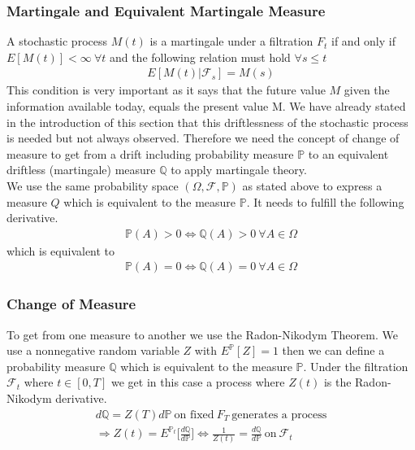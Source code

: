 \documentclass[11pt]{article}
\numberwithin{equation}{subsection}
\begin{document}
\subsubsection{Martingale and Equivalent Martingale Measure}
A stochastic process \(M(t)\) is a martingale under a filtration \(F_t\) if and only if \(E[M(t)] < \infty \  \forall t\) and the following relation must hold \(\forall s \leq t\)
\begin{eqnarray*}
	E[M(t)|\mathcal{F}_s] = M(s)
\end{eqnarray*}
This condition is very important as it says that the future value \(M\) given the information available today, equals the present value M. We have already stated in the introduction of this section that this driftlessness of the stochastic process is needed but not always observed. Therefore we need the concept of change of measure to get from a drift including probability measure \(\mathbb{P}\) to an equivalent driftless (martingale) measure \(\mathbb{Q}\) to apply martingale theory.\\
We use the same probability space \((\Omega, \mathcal{F}, \mathbb{P})\) as stated above to express a measure \(Q\) which is equivalent to the measure \(\mathbb{P}\). It needs to fulfill the following derivative.
\begin{eqnarray*}
	\mathbb{P}(A) > 0 \iff \mathbb{Q}(A) > 0 \ \forall A \in \Omega 
\end{eqnarray*}
which is equivalent to
\begin{eqnarray*}
	\mathbb{P}(A) = 0 \iff \mathbb{Q}(A) = 0 \ \forall A \in \Omega 
\end{eqnarray*}
\subsubsection{Change of Measure}
To get from one measure to another we use the Radon-Nikodym Theorem. We use a nonnegative random variable \(Z\) with \(E^{\mathbb{P}}[Z]=1\) then we can define a probability measure \(\mathbb{Q}\) which is equivalent to the measure \(\mathbb{P}\). Under the filtration \(\mathcal{F}_t\) where \(t \in [0, T]\) we get in this case a process where \(Z(t)\) is the Radon-Nikodym derivative.
\begin{eqnarray*}
d\mathbb{Q} = Z(T)d\mathbb{P} \ \text{on fixed} \  F_T \ \text{generates a process}\\
\Rightarrow Z(t) = E^{\mathbb{P}_t}\Big[\frac{d\mathbb{Q}}{d\mathbb{P}}\Big] \iff \frac{1}{Z(t)} = \frac{d\mathbb{Q}}{d\mathbb{P}} \ \text{on} \ \mathcal{F}_t
\end{eqnarray*}
\end{document}
